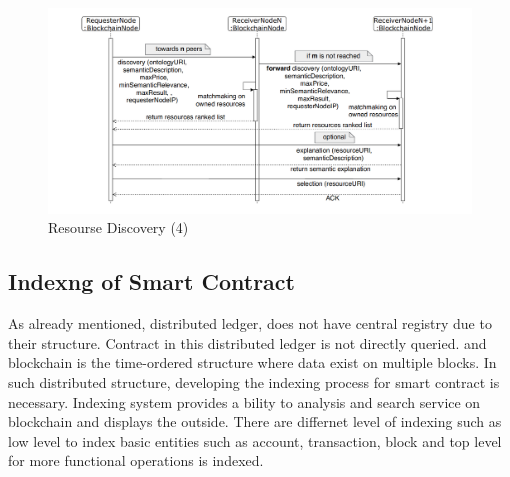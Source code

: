  
 \begin{center}
 	\begin{figure}[htb!]
 		
 		\begin{minipage}{0.55\linewidth}
 			\centering
 			\includegraphics[width=1.95\textwidth]{images/chap01_SemanticBlockChain.png}
 		\end{minipage}
 		\caption[Resourse Discovery]{Resourse Discovery (4)}
 		
 	\end{figure}
 	
 \end{center}

\subsection{Indexng of Smart Contract}
As already mentioned, distributed ledger, does not have central registry due to their structure. Contract in this distributed ledger is not directly queried.
and blockchain is the time-ordered structure where data exist on multiple blocks.
In such distributed structure, developing the indexing process for smart contract is necessary. Indexing system provides a bility to analysis and search service on blockchain  and displays the outside.
There are differnet level of indexing such as low level to index basic entities such as account, transaction, block and top level for more functional operations is indexed.


